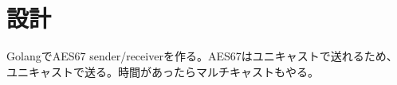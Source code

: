 \chapter{設計}
\label{chap:design}

GolangでAES67 sender/receiverを作る。AES67はユニキャストで送れるため、ユニキャストで送る。時間があったらマルチキャストもやる。
